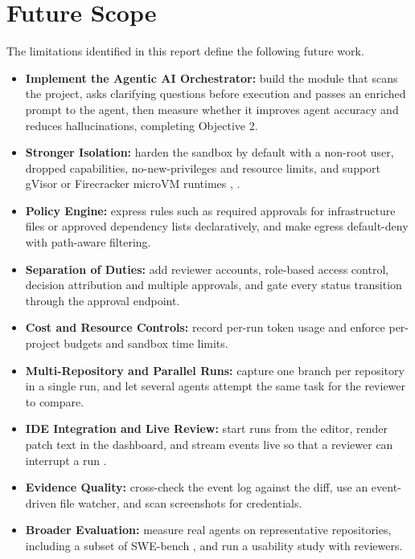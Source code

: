 \documentclass[12pt,a4paper,oneside]{report}
\providecommand{\tightlist}{\setlength{\itemsep}{0pt}\setlength{\parskip}{0pt}}
\begin{document}
\clearpage

\chapter{Future Scope}\label{future-scope}

The limitations identified in this report define the following future work.

\begin{itemize}
\tightlist
\item
  \textbf{Implement the Agentic AI Orchestrator:} build the module that scans the project, asks clarifying questions before execution and passes an enriched prompt to the agent, then measure whether it improves agent accuracy and reduces hallucinations, completing Objective 2.
\item
  \textbf{Stronger Isolation:} harden the sandbox by default with a non-root user, dropped capabilities, no-new-privileges and resource limits, and support gVisor or Firecracker microVM runtimes \cite{ref12}, \cite{ref13}.
\item
  \textbf{Policy Engine:} express rules such as required approvals for infrastructure files or approved dependency lists declaratively, and make egress default-deny with path-aware filtering.
\item
  \textbf{Separation of Duties:} add reviewer accounts, role-based access control, decision attribution and multiple approvals, and gate every status transition through the approval endpoint.
\item
  \textbf{Cost and Resource Controls:} record per-run token usage and enforce per-project budgets and sandbox time limits.
\item
  \textbf{Multi-Repository and Parallel Runs:} capture one branch per repository in a single run, and let several agents attempt the same task for the reviewer to compare.
\item
  \textbf{IDE Integration and Live Review:} start runs from the editor, render patch text in the dashboard, and stream events live so that a reviewer can interrupt a run \cite{ref9}.
\item
  \textbf{Evidence Quality:} cross-check the event log against the diff, use an event-driven file watcher, and scan screenshots for credentials.
\item
  \textbf{Broader Evaluation:} measure real agents on representative repositories, including a subset of SWE-bench \cite{ref2}, and run a usability study with reviewers.
\end{itemize}
\end{document}
